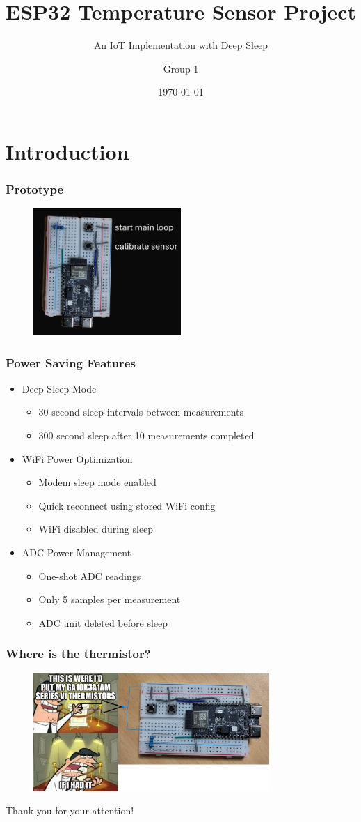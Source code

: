 \documentclass[11pt,t,usepdftitle=false,aspectratio=169]{beamer}
\title[Temperature Sensor]{ESP32 Temperature Sensor Project}
\subtitle{An IoT Implementation with Deep Sleep}
\author{Group 1}
\date{\today}
\begin{document}
\section{Introduction}

\begin{frame}
\frametitle{Prototype}
  \begin{figure}
    \centering
    \includegraphics[width=0.5\textwidth]{_images/image_text.png}
  \end{figure}
\end{frame}


\begin{frame}
  \frametitle{Power Saving Features}
    \begin{itemize}
      \item Deep Sleep Mode
      \begin{itemize}
        \item 30 second sleep intervals between measurements
        \item 300 second sleep after 10 measurements completed
      \end{itemize}
      \item WiFi Power Optimization
      \begin{itemize}
        \item Modem sleep mode enabled
        \item Quick reconnect using stored WiFi config
        \item WiFi disabled during sleep
      \end{itemize}
      \item ADC Power Management
      \begin{itemize}
        \item One-shot ADC readings
        \item Only 5 samples per measurement
        \item ADC unit deleted before sleep
      \end{itemize}
    \end{itemize}
  \end{frame}


\begin{frame}
  \frametitle{Where is the thermistor?}
  \begin{figure}
    \centering
    \includegraphics[width=0.8\textwidth]{_images/9i922u.jpg}
  \end{figure}
  Thank you for your attention!
\end{frame}
\end{document}
